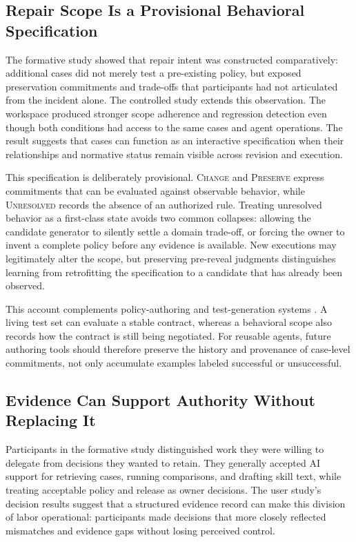 \subsection{Repair Scope Is a Provisional Behavioral Specification}

The formative study showed that repair intent was constructed comparatively:
additional cases did not merely test a pre-existing policy, but exposed
preservation commitments and trade-offs that participants had not articulated
from the incident alone. The controlled study extends this observation. The
workspace produced stronger scope adherence and regression detection even
though both conditions had access to the same cases and agent operations. The
result suggests that cases can function as an interactive specification when
their relationships and normative status remain visible across revision and
execution.

This specification is deliberately provisional. \textsc{Change} and
\textsc{Preserve} express commitments that can be evaluated against observable
behavior, while \textsc{Unresolved} records the absence of an authorized rule.
Treating unresolved behavior as a first-class state avoids two common
collapses: allowing the candidate generator to silently settle a domain
trade-off, or forcing the owner to invent a complete policy before any
evidence is available. New executions may legitimately alter the scope, but
preserving pre-reveal judgments distinguishes learning from retrofitting the
specification to a candidate that has already been observed.

This account complements policy-authoring and test-generation systems
\cite{lam2025policymaps,lee2026dataprompt,koh2026contrastive}. A living test set
can evaluate a stable contract, whereas a behavioral scope also records how
the contract is still being negotiated. For reusable agents, future authoring
tools should therefore preserve the history and provenance of case-level
commitments, not only accumulate examples labeled successful or unsuccessful.

\subsection{Evidence Can Support Authority Without Replacing It}

Participants in the formative study distinguished work they were willing to
delegate from decisions they wanted to retain. They generally accepted AI
support for retrieving cases, running comparisons, and drafting skill text,
while treating acceptable policy and release as owner decisions. The user
study's decision results suggest that a structured evidence record can make
this division of labor operational: participants made decisions that more
closely reflected mismatches and evidence gaps without losing perceived
control.

